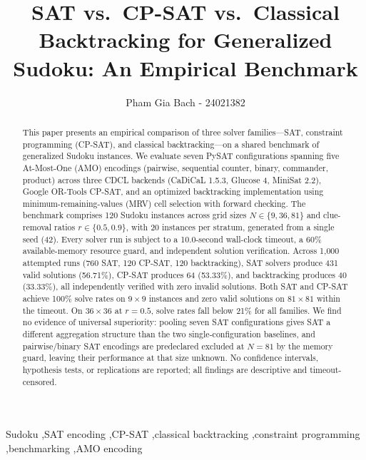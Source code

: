 \documentclass[a4paper,fleqn]{cas-sc}
\begin{document}

\title{SAT vs.\ CP-SAT vs.\ Classical Backtracking for Generalized Sudoku: An Empirical Benchmark}

\author[1]{Pham Gia Bach - 24021382}

\cormark[1]


\begin{abstract}
This paper presents an empirical comparison of three solver families---SAT, constraint programming (CP-SAT), and classical backtracking---on a shared benchmark of generalized Sudoku instances. We evaluate seven PySAT configurations spanning five At-Most-One (AMO) encodings (pairwise, sequential counter, binary, commander, product) across three CDCL backends (CaDiCaL 1.5.3, Glucose 4, MiniSat 2.2), Google OR-Tools CP-SAT, and an optimized backtracking implementation using minimum-remaining-values (MRV) cell selection with forward checking. The benchmark comprises 120 Sudoku instances across grid sizes \(N \in \{9, 36, 81\}\) and clue-removal ratios \(r \in \{0.5, 0.9\}\), with 20 instances per stratum, generated from a single seed (42). Every solver run is subject to a 10.0-second wall-clock timeout, a 60\% available-memory resource guard, and independent solution verification. Across 1{,}000 attempted runs (760 SAT, 120 CP-SAT, 120 backtracking), SAT solvers produce 431 valid solutions (56.71\%), CP-SAT produces 64 (53.33\%), and backtracking produces 40 (33.33\%), all independently verified with zero invalid solutions. Both SAT and CP-SAT achieve 100\% solve rates on \(9\times9\) instances and zero valid solutions on \(81\times81\) within the timeout. On \(36\times36\) at \(r=0.5\), solve rates fall below 21\% for all families. We find no evidence of universal superiority: pooling seven SAT configurations gives SAT a different aggregation structure than the two single-configuration baselines, and pairwise/binary SAT encodings are predeclared excluded at \(N=81\) by the memory guard, leaving their performance at that size unknown. No confidence intervals, hypothesis tests, or replications are reported; all findings are descriptive and timeout-censored.
\end{abstract}

\begin{keywords}
Sudoku \sep SAT encoding \sep CP-SAT \sep classical backtracking \sep constraint programming \sep benchmarking \sep AMO encoding
\end{keywords}
\end{document}
